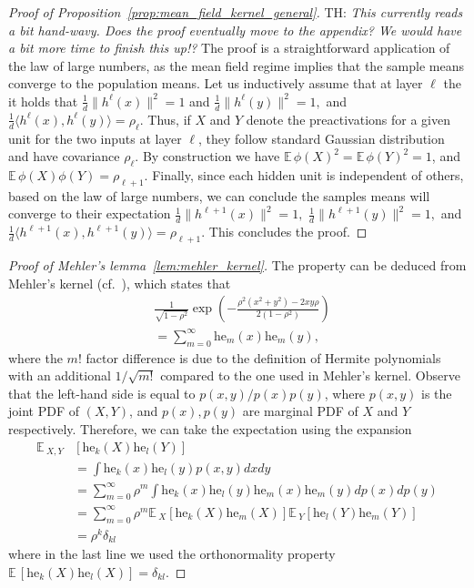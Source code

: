\documentclass[twoside]{article}
\newcommand{\E}{\mathbb{E}\,}
\newcommand{\he}{\mathrm{he}}
\theoremstyle{definition}
\newcommand{\thomas}[1]{{\color{blue}TH:  \textit{#1}}}
\begin{document}
\begin{proof}[Proof of Proposition~\ref{prop:mean_field_kernel_general}]
\thomas{This currently reads a bit hand-wavy. Does the proof eventually move to the appendix? We would have a bit more time to finish this up!?}
 The proof is a straightforward application of the law of large numbers, as the mean field regime implies that the sample means converge to the population means. Let us inductively assume that at layer $\ell$ the it holds that $\frac1d\|h^{\ell}(x)\|^2 = 1$ and $\frac1d\|h^{\ell}(y)\|^2=1,$ and $\frac1d\langle h^{\ell}(x),h^{\ell}(y)\rangle = \rho_{\ell}$. Thus, if $X$ and $Y$ denote the preactivations for a given unit for the two inputs at layer $\ell$, they follow standard Gaussian distribution and have covariance $\rho_{\ell}.$ By construction we have $\E \phi(X)^2 = \E \phi(Y)^2 = 1$, and $\E \phi(X)\phi(Y) = \rho_{\ell+1}.$ Finally, since each hidden unit is independent of others, based on the law of large numbers, we can conclude the samples means will converge to their expectation $\frac1d \|h^{\ell+1}(x)\|^2 = 1, $ $\frac1d \|h^{\ell+1}(y)\|^2 = 1,$ and $\frac1d \langle h^{\ell+1}(x),h^{\ell+1}(y)\rangle = \rho_{\ell+1}. $ This concludes the proof. 
\end{proof}

\begin{proof}[Proof of Mehler's lemma~\ref{lem:mehler_kernel}]
The property can be deduced from Mehler's kernel (cf.~\citep{mehler1866ueber}), which states that 
\begin{align*}
&\frac{1}{\sqrt{1-\rho^2}}\exp\left(-\frac{\rho^2(x^2+y^2)-2xy\rho}{2(1-\rho^2)}\right) \\
&= \sum_{m=0}^\infty \he_m(x)\he_m(y),
\end{align*}
where the $m!$ factor difference is due to the definition of Hermite polynomials with an additional $1/\sqrt{m!}$ compared to the one used in Mehler's kernel. 
Observe that the left-hand side is equal to $p(x,y)/p(x)p(y)$, where $p(x,y)$ is the joint PDF of $(X, Y)$, and $p(x),p(y)$ are marginal PDF of $X$ and $Y$ respectively. Therefore, we can take the expectation using the expansion 
\begin{align*}
\E_{X,Y}&\left[ \he_k(X) \he_l(Y)\right] \\
&= \int \he_k(x)\he_l(y)p(x,y)dx dy \\
&=  \sum_{m=0}^\infty \rho^m\int \he_k(x)\he_l(y) \he_m(x)\he_m(y) dp(x)dp(y)\\
&= \sum_{m=0}^\infty \rho^m\E_{X} \left[\he_k(X)\he_m(X)\right]\E_{Y} \left[\he_l(Y)\he_m(Y)\right] \\
&= \rho^k \delta_{kl} 
\end{align*}
where in the last line we used the orthonormality property $\E[\he_k(X) \he_l(X)]=\delta_{kl}$. 
\end{proof}
\end{document}
